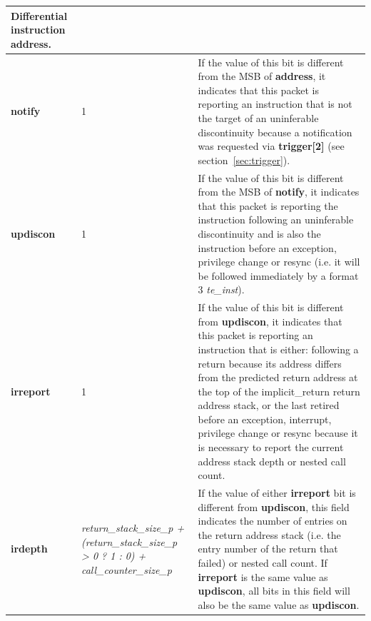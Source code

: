 \begin{table}[htp]
\begin{tabulary}{\textwidth}{|l|p{35mm}|p{90mm}|}
                Differential instruction address.\\
    \hline
    \textbf{notify}	& 1 & 
                If the value of this bit is different from the MSB of \textbf{address}, it indicates that this 
                packet is reporting an instruction that is not the target of an uninferable discontinuity 
                because a notification was requested via \textbf{trigger[2]} (see section~\ref{sec:trigger}). \\
    \hline
    \textbf{updiscon}	& 1 & 
                If the value of this bit is different from the MSB of \textbf{notify}, it indicates that this 
                packet is reporting the instruction following an uninferable discontinuity and is also the 
                instruction before an exception, privilege change or resync 
                (i.e. it will be followed immediately by a format 3 \textit{te\_inst}).\\
    \hline
    \textbf{irreport}	& 1 & 
                If the value of this bit is different from \textbf{updiscon}, it indicates that this packet is
                reporting an instruction that is either: \newline
                following a return because its address differs from the predicted return address at the top of 
                the implicit\_return return address stack, or \newline
                the last retired before an exception, interrupt, privilege change or resync because it is necessary to report 
                the current address stack depth or nested call count. \\
    \hline
    \textbf{irdepth}	& \textit {return\_stack\_size\_p + (return\_stack\_size\_p > 0 ? 1 : 0) + call\_counter\_size\_p} & 
                If the value of either \textbf{irreport} bit is different from \textbf{updiscon}, this field 
				indicates the number of entries on the return address stack (i.e. the entry number of the return that
                failed) or nested call count.  If \textbf{irreport} is the same value as \textbf{updiscon}, 
                all bits in this field  will also be the same value as \textbf{updiscon}. \\
    \hline
  \end{tabulary}
\end{table}

